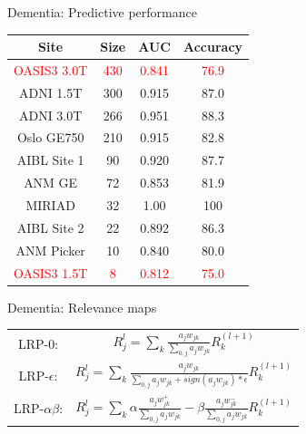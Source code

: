 \documentclass[c]{beamer}
\begin{document}
	\begin{frame}{Dementia: Predictive performance} %
		\centering
		\vfill
		\begin{tabular}{|c|c|c|c|}
			\hline
			\textbf{Site}&\textbf{Size}&\textbf{AUC}&\textbf{Accuracy}\\
			\hline
			\textcolor{red}{OASIS3 3.0T}&\textcolor{red}{430}&\textcolor{red}{0.841}&\textcolor{red}{76.9}\\
			\hline
			ADNI 1.5T&300&0.915&87.0\\
			\hline
			ADNI 3.0T&266&0.951&88.3\\
			\hline
			Oslo GE750&210&0.915&82.8\\
			\hline
			AIBL Site 1&90&0.920&87.7\\
			\hline
			ANM GE&72&0.853&81.9\\
			\hline
			MIRIAD&32&1.00&100\\
			\hline
			AIBL Site 2&22&0.892&86.3\\
			\hline
			ANM Picker&10&0.840&80.0\\
			\hline
			\textcolor{red}{OASIS3 1.5T}&\textcolor{red}{8}&\textcolor{red}{0.812}&\textcolor{red}{75.0}\\
			\hline
		\end{tabular}
		\vfill
	\end{frame}
	
	\begin{frame}{Dementia: Relevance maps} %
		\begin{center}
			\begin{tabular}{c c}
				LRP-0:&$R^l_j = \sum\limits_k \frac{a_jw_{jk}}{\sum\limits_{0,j} a_jw_{jk}}R^{(l+1)}_k$\\
				LRP-$\epsilon$:&$R^l_j = \sum\limits_k \frac{a_jw_{jk}}{\sum\limits_{0,j} a_jw_{jk} + sign(a_jw_{jk})*\epsilon}R^{(l+1)}_k$\\
				LRP-$\alpha\beta$:&$R^l_j = \sum\limits_k \alpha\frac{a_jw_{jk}^+}{\sum\limits_{0,j} a_jw_{jk}} - \beta\frac{a_jw_{jk}^-}{\sum\limits_{0,j} a_jw_{jk}} R^{(l+1)}_k$\\
			\end{tabular}
		\end{center}
	\end{frame}
	
\end{document}
